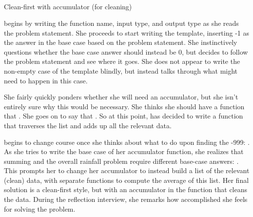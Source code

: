 \subsection{\sten}
{Clean-first with accumulator (for cleaning)}

\sten begins by writing the function name, input type, and output type
as she reads the problem statement.  She proceeds to start writing the
template, inserting -1 as the answer in the base case based on the
problem statement.  She instinctively questions
whether the base case answer should instead be 0, but decides to follow the problem
statement and see where it goes.  She does not appear to write the
non-empty case of the template blindly, but instead talks through what
might need to happen in this case.

She fairly quickly ponders whether she will need an accumulator, but
she isn't entirely sure why this would be necessary.  She thinks she
should have a function that .  She goes on to say that .  So at this point, \sten has decided to write a function that
traverses the list and adds up all the relevant data.

\sten begins to change course once she thinks about what to do upon
finding the -999: .  As she
tries to write the base case of her accumulator function, she realizes
that summing and the overall rainfall problem require different
base-case answers:
.  This prompts her to change her
accumulator to instead build a list of the relevant (clean) data, with
separate functions to compute the average of this list.  Her final
solution is a clean-first style, but with an accumulator in the
function that cleans the data.  During the reflection interview, she
remarks how accomplished she feels for solving the problem.

